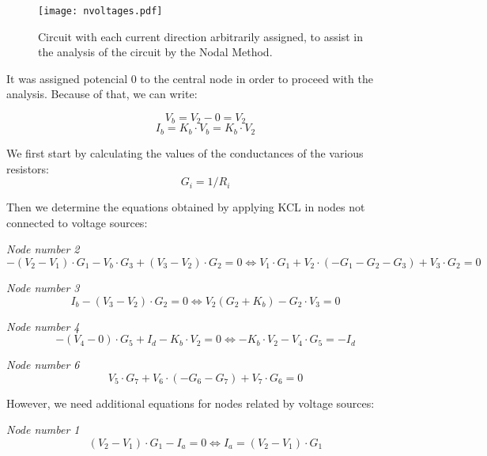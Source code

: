\begin{figure}[H] \centering
\texttt{[image: nvoltages.pdf]}
\caption{Circuit with each current direction arbitrarily assigned, to assist in the analysis of the circuit by the Nodal Method.}
\label{fig:nvoltages}
\end{figure}

It was assigned potencial 0 to the central node in order to proceed with the analysis. Because of that, we can write:

\begin{equation}
  V_b=V_2 - 0 = V_2
\end{equation}
\begin{equation}
  I_b= K_b \cdot V_b= K_b \cdot V_2
\end{equation}

We first start by calculating the values of the conductances of the various resistors:
\begin{equation}
  G_i=1/R_i
\end{equation}

Then we determine the equations obtained by applying KCL in nodes not connected to voltage sources:

\textit{Node number 2}
\begin{equation}
  -(V_2 -V_1)\cdot G_1 -V_b \cdot G_3 + (V_3-V_2)\cdot G_2 =0 
  \Leftrightarrow V_1\cdot G_1+V_2 \cdot (-G_1-G_2-G_3) + V_3\cdot G_2 =0
  \label{eq:kcl2}
\end{equation}

\textit{Node number 3}
\begin{equation}
  I_b - (V_3-V_2) \cdot G_2=0 \Leftrightarrow V_2(G_2 + K_b) - G_2 \cdot V_3 =0
  \label{eq:kcl3}
\end{equation}

\textit{Node number 4}
\begin{equation}
  -(V_4-0) \cdot G_5+I_d-K_b\cdot V_2=0 \Leftrightarrow -K_b\cdot V_2-V_4 \cdot G_5 = -I_d
  \label{eq:kcl4}
\end{equation}

\textit{Node number 6}
\begin{equation}
 	V_5 \cdot G_7 + V_6\cdot (-G_6 -G_7) + V_7 \cdot G_6 =0
  \label{eq:kcl6}
\end{equation}

However, we need additional equations for nodes related by voltage sources:

\textit{Node number 1}
\begin{equation}
  (V_2 - V_1)\cdot G_1 -I_a =0 \Leftrightarrow I_a=(V_2 - V_1)\cdot G_1
  \label{eq:kcl}
\end{equation}

